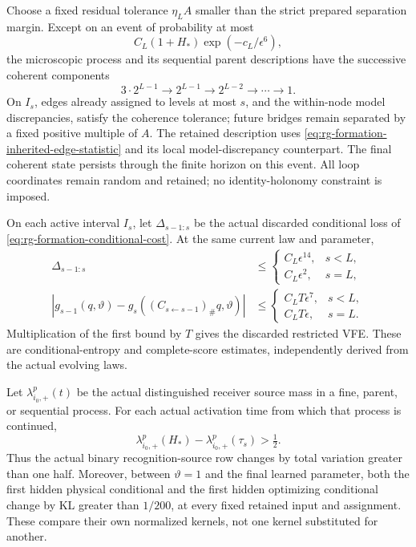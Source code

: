 Choose a fixed residual tolerance \(\eta_LA\) smaller than the
strict prepared separation margin. Except on an event of probability
at most
\begin{equation}
C_L(1+H_*)\exp(-c_L/\epsilon^6),
\label{eq:rg-formation-coherence-probability}
\end{equation}
the microscopic process and its sequential parent descriptions have
the successive coherent components
\begin{equation}
3\cdot2^{L-1}\longrightarrow2^{L-1}
\longrightarrow2^{L-2}\longrightarrow\cdots\longrightarrow1.
\label{eq:rg-formation-agent-counts}
\end{equation}
On \(I_s\), edges already assigned to levels at most \(s\), and the
within-node model discrepancies, satisfy the coherence tolerance;
future bridges remain separated by a fixed positive multiple of \(A\).
The retained description uses
\cref{eq:rg-formation-inherited-edge-statistic} and its local
model-discrepancy counterpart. The final coherent state persists through the
finite horizon on this event. All loop coordinates remain random and
retained; no identity-holonomy constraint is imposed.

On each active interval \(I_s\), let
\(\Delta_{s-1:s}\) be the actual discarded conditional loss of
\cref{eq:rg-formation-conditional-cost}. At the same current law
and parameter,
\begin{equation}
\begin{aligned}
\Delta_{s-1:s}
 &\le
 \begin{cases}
C_L\epsilon^{14},&s<L,\\
C_L\epsilon^2,&s=L,
\end{cases}\\
|g_{s-1}(q,\vartheta)
 -g_s((C_{s\leftarrow s-1})_\#q,\vartheta)|
 &\le
 \begin{cases}
C_LT\epsilon^7,&s<L,\\
C_LT\epsilon,&s=L.
\end{cases}
\end{aligned}
\label{eq:rg-formation-conditional-score-bounds}
\end{equation}
Multiplication of the first bound by \(T\) gives the discarded
restricted VFE. These are conditional-entropy and complete-score
estimates, independently derived from the actual evolving laws.

Let \(\lambda^p_{i_0,+}(t)\) be the actual distinguished receiver
source mass in a fine, parent, or sequential process. For each actual
activation time from which that process is continued,
\begin{equation}
\lambda^p_{i_0,+}(H_*)-
  \lambda^p_{i_0,+}(\tau_s)>\tfrac12.
\label{eq:rg-formation-source-movement}
\end{equation}
Thus the actual binary recognition-source row changes by total
variation greater than one half. Moreover, between
\(\vartheta=1\) and the final learned parameter, both the first hidden
physical conditional and the first hidden optimizing conditional change
by KL greater than \(1/200\), at every fixed retained input and
assignment. These compare their own normalized kernels, not one kernel
substituted for another. 

